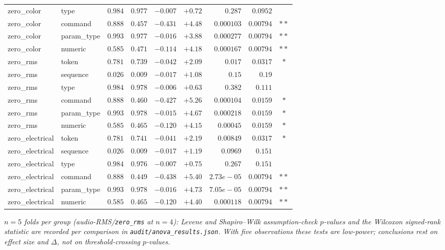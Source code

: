 \begin{table}[!htbp]
\begin{tabular}{l l r r r r r r c}
zero\_color & type & $0.984$ & $0.977$ & $-0.007$ & $+0.72$ & $0.287$ & $0.0952$ &  \\
zero\_color & command & $0.888$ & $0.457$ & $-0.431$ & $+4.48$ & $0.000103$ & $0.00794$ & $\ast\ast$ \\
zero\_color & param\_type & $0.993$ & $0.977$ & $-0.016$ & $+3.88$ & $0.000277$ & $0.00794$ & $\ast\ast$ \\
zero\_color & numeric & $0.585$ & $0.471$ & $-0.114$ & $+4.18$ & $0.000167$ & $0.00794$ & $\ast\ast$ \\
zero\_rms & token & $0.781$ & $0.739$ & $-0.042$ & $+2.09$ & $0.017$ & $0.0317$ & $\ast$ \\
zero\_rms & sequence & $0.026$ & $0.009$ & $-0.017$ & $+1.08$ & $0.15$ & $0.19$ &  \\
zero\_rms & type & $0.984$ & $0.978$ & $-0.006$ & $+0.63$ & $0.382$ & $0.111$ &  \\
zero\_rms & command & $0.888$ & $0.460$ & $-0.427$ & $+5.26$ & $0.000104$ & $0.0159$ & $\ast$ \\
zero\_rms & param\_type & $0.993$ & $0.978$ & $-0.015$ & $+4.67$ & $0.000218$ & $0.0159$ & $\ast$ \\
zero\_rms & numeric & $0.585$ & $0.465$ & $-0.120$ & $+4.15$ & $0.00045$ & $0.0159$ & $\ast$ \\
zero\_electrical & token & $0.781$ & $0.741$ & $-0.041$ & $+2.19$ & $0.00849$ & $0.0317$ & $\ast$ \\
zero\_electrical & sequence & $0.026$ & $0.009$ & $-0.017$ & $+1.19$ & $0.0969$ & $0.151$ &  \\
zero\_electrical & type & $0.984$ & $0.976$ & $-0.007$ & $+0.75$ & $0.267$ & $0.151$ &  \\
zero\_electrical & command & $0.888$ & $0.449$ & $-0.438$ & $+5.40$ & $2.73e-05$ & $0.00794$ & $\ast\ast$ \\
zero\_electrical & param\_type & $0.993$ & $0.978$ & $-0.016$ & $+4.73$ & $7.05e-05$ & $0.00794$ & $\ast\ast$ \\
zero\_electrical & numeric & $0.585$ & $0.465$ & $-0.120$ & $+4.40$ & $0.000118$ & $0.00794$ & $\ast\ast$ \\
\bottomrule
\end{tabular}
\par\smallskip
\footnotesize\textit{$n=5$ folds per group (audio-RMS/\texttt{zero\_rms} at $n=4$): Levene and Shapiro--Wilk assumption-check $p$-values and the Wilcoxon signed-rank statistic are recorded per comparison in \texttt{audit/anova\_results.json}. With five observations these tests are low-power; conclusions rest on effect size and $\Delta$, not on threshold-crossing $p$-values.}
\end{table}